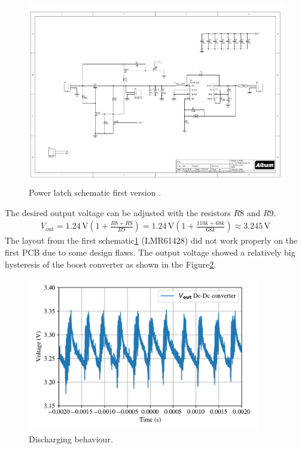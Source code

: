 \begin{figure}[ht]
	\centering
	\includegraphics[clip, trim=4cm 5cm 2cm 6cm, width=1\textwidth]{4-development/hardware/graphics/PowerLatch/PwrLatch_V1_sch.pdf}
	\caption{Power latch schematic first version .\label{development:scematicV1}}
\end{figure}
The desired output voltage can be adjusted with the resistors $R8$ and $R9$.
\begin{align}
V_{\text{out}}= 1.24\,\text{V} \left(1 + \frac{R8+R9}{R9} \right)= 1.24\,\text{V} \left(1 + \frac{110k+68k}{68k} \right) \approx 3.245\,\text{V} 
\end{align}
The layout from the first schematic\ref{development:scematicV1} (LMR61428) did not work properly on the first PCB due to some design flaws. The output voltage showed a relatively big 
hysteresis of the boost converter as shown in the Figure\ref{development:rippel}.  
\begin{figure}[ht]
	\centering
	\includegraphics[width=0.9\textwidth]{4-development/hardware/graphics/scope/rippel.pdf}
	\caption{Discharging behaviour.\label{development:rippel}}
\end{figure}
